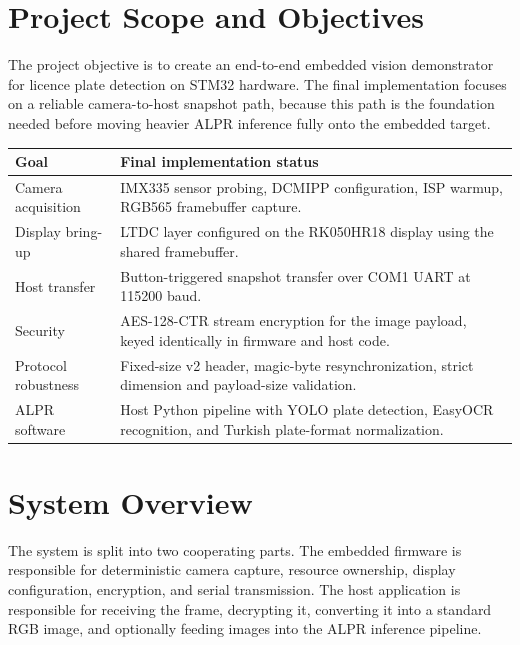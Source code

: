 \documentclass[11pt,a4paper]{article}
\begin{document}
\section{Project Scope and Objectives}
The project objective is to create an end-to-end embedded vision demonstrator
for licence plate detection on STM32 hardware. The final implementation focuses
on a reliable camera-to-host snapshot path, because this path is the foundation
needed before moving heavier ALPR inference fully onto the embedded target.

\begin{tabularx}{\textwidth}{@{}lX@{}}
\toprule
\textbf{Goal} & \textbf{Final implementation status} \\
\midrule
Camera acquisition & IMX335 sensor probing, DCMIPP configuration, ISP warmup, RGB565 framebuffer capture. \\
Display bring-up & LTDC layer configured on the RK050HR18 display using the shared framebuffer. \\
Host transfer & Button-triggered snapshot transfer over COM1 UART at 115200 baud. \\
Security & AES-128-CTR stream encryption for the image payload, keyed identically in firmware and host code. \\
Protocol robustness & Fixed-size v2 header, magic-byte resynchronization, strict dimension and payload-size validation. \\
ALPR software & Host Python pipeline with YOLO plate detection, EasyOCR recognition, and Turkish plate-format normalization. \\
\bottomrule
\end{tabularx}

\section{System Overview}
The system is split into two cooperating parts. The embedded firmware is
responsible for deterministic camera capture, resource ownership, display
configuration, encryption, and serial transmission. The host application is
responsible for receiving the frame, decrypting it, converting it into a
standard RGB image, and optionally feeding images into the ALPR inference
pipeline.
\end{document}
